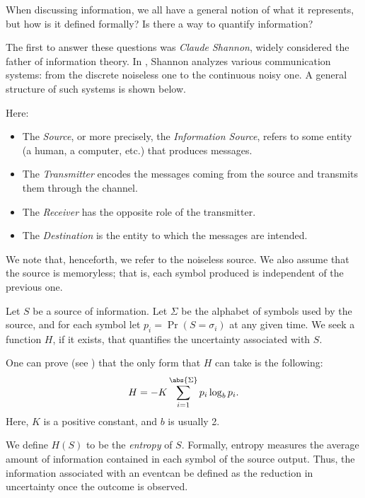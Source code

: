 \documentclass{subfiles}
\begin{document}
    When discussing information, we all have a general notion of what it represents, 
        but how is it defined formally? Is there a way to quantify information?

    The first to answer these questions was \emph{Claude Shannon}, 
        widely considered the father of information theory.
        In \cite{shannon1948}, Shannon analyzes various communication systems:
        from the discrete noiseless one to the continuous noisy one.
    A general structure of such systems is shown below.
    

    Here:
    \begin{itemize}
        \item The \emph{Source}, or more precisely, 
            the \emph{Information Source}, refers to some entity
            (a human, a computer, etc.) that produces messages.

        \item The \emph{Transmitter} encodes the messages coming from the source
            and transmits them through the channel.

        \item The \emph{Receiver} has the opposite role of the transmitter.

        \item The \emph{Destination} is the entity to which the messages are intended.
    \end{itemize}

    \begin{remark*}
        We note that, henceforth, we refer to the noiseless source.
        We also assume that the source is memoryless; 
        that is, each symbol produced is independent of the previous one.
    \end{remark*}

    Let \(S\) be a source of information. 
        Let \(\Sigma\) be the alphabet of symbols used by the source,
        and for each symbol let \(p_{i} = \Pr(S = \sigma_{i})\) at any given time.
        We seek a function \(H\), if it exists, 
        that quantifies the uncertainty associated with \(S\).

    One can prove (see \cite[Appendix 2]{shannon1948}) that
        the only form that \(H\) can take is the following:
        \begin{equation}\label{Eq:1}
            H = -K \sum_{i = 1}^{\abs{\Sigma}}{p_{i} \log_{b} p_{i}}\text{.}
        \end{equation}
        Here, \(K\) is a positive constant, and \(b\) is usually 2.

    We define \(H(S)\) to be the \emph{entropy} of \(S\). 
    Formally, entropy measures the average amount of information contained 
        in each symbol of the source output.
        Thus, the information associated with an event\footnotemark can be defined
        as the reduction in uncertainty once the outcome is observed.

\end{document}
